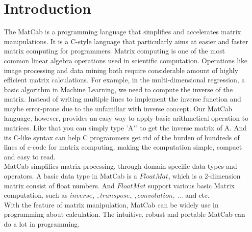 \documentclass[12pt]{article} %
\begin{document}

\tableofcontents %

\newpage %


\section{Introduction} %

The MatCab is a programming language that simplifies and accelerates matrix manipulations. It is a C-style language that particularly aims at easier and faster matrix computing for programmers. Matrix computing is one of the most common linear algebra operations used in scientific computation. Operations like image processing and data mining both require considerable amount of highly efficient matrix calculations. For example, in the multi-dimensional regression, a basic algorithm in Machine Learning, we need to compute the inverse of the matrix. Instead of writing multiple lines to implement the inverse function and maybe error-prone due to the unfamiliar with inverse concept. Our MatCab language, however, provides an easy way to apply basic arithmetical operation to matrices. Like that you can simply type 'A"' to get the inverse matrix of A. And its C-like syntax can help C programmers get rid of the burden of hundreds of lines of c-code for matrix computing, making the computation simple, compact and easy to read. \\
MatCab simplifies matrix processing, through domain-specific data types and operators. A basic data type in MatCab is a $FloatMat$, which is a 2-dimension matrix consist of float numbers. And $FloatMat$ support  various basic Matrix computation, such as $inverse,~,transpose,~,convolution,~\dots$ and etc.\\
With the feature of matrix manipulation, MatCab can be widely use in programming about calculation. The intuitive, robust and portable MatCab can do a lot in programming. 
\end{document}
